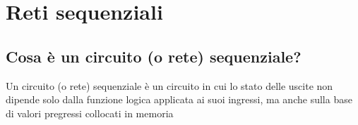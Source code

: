 \chapter{Reti sequenziali}

\section{Cosa è un circuito (o rete) sequenziale?}
Un circuito (o rete) sequenziale è un circuito in cui lo stato delle uscite non dipende solo dalla funzione logica applicata ai suoi ingressi, ma anche sulla base di valori pregressi collocati in memoria